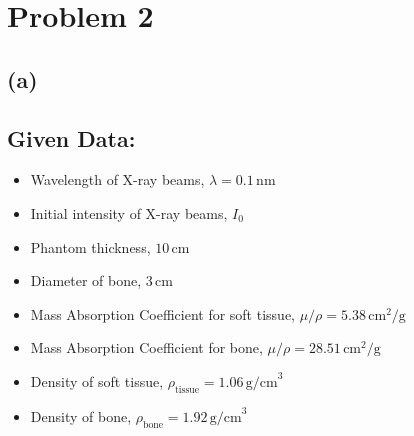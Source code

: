 \documentclass[12pt]{article}
\begin{document}
\newpage




















































\newpage
\section*{Problem 2}
\subsection*{(a)}
\subsection*{Given Data:}
\begin{itemize}
    \item Wavelength of X-ray beams, $\lambda = 0.1 \, \text{nm}$
    \item Initial intensity of X-ray beams, $I_0$
    \item Phantom thickness, $10 \, \text{cm}$
    \item Diameter of bone, $3 \, \text{cm}$
    \item Mass Absorption Coefficient for soft tissue, $\mu/\rho = 5.38 \, \text{cm}^2/\text{g}$
    \item Mass Absorption Coefficient for bone, $\mu/\rho = 28.51 \, \text{cm}^2/\text{g}$
    \item Density of soft tissue, $\rho_{\text{tissue}} = 1.06 \, \text{g/cm}^3$
    \item Density of bone, $\rho_{\text{bone}} = 1.92 \, \text{g/cm}^3$
\end{itemize}
\end{document}
